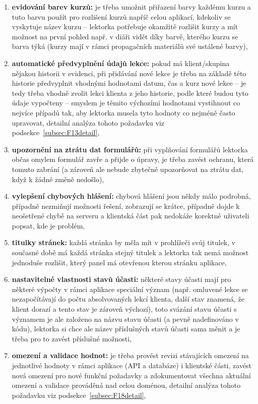 \begin{enumerate}[label=\textbf{F\arabic*}]
    \item \label{F12} \textbf{evidování barev kurzů:} je třeba umožnit přiřazení barvy každému kurzu a tuto barvu použít pro rozlišení kurzů napříč celou aplikací, kdekoliv se vyskytuje název kurzu -- lektorka potřebuje okamžitě rozlišit kurzy a mít možnost na první pohled např. v diáři vidět díky barvě, kterého kurzu se barva týká (kurzy mají v rámci propagačních materiálů své ustálené barvy),
    \item \label{F13} \textbf{automatické předvyplnění údajů lekce:} pokud má klient/skupina nějakou historii v evidenci, při přidávání nové lekce je třeba na základě této historie předvyplnit vhodnými hodnotami datum, čas a kurz nové lekce -- je tedy třeba vhodně zvolit lekci klienta z jeho historie, podle které budou tyto údaje vypočteny  -- smyslem je těmito výchozími hodnotami vystihnout co nejvíce případů tak, aby lektorka musela tyto hodnoty co nejméně často upravovat, detailní analýza tohoto požadavku viz podsekce~\ref{subsec:F13detail},
    \item \label{F14} \textbf{upozornění na ztrátu dat formulářů:} při vyplňování formulářů lektorka občas omylem formulář zavře a přijde o úpravy, je třeba zavést ochranu, která tomuto zabrání (a zároveň ale nebude zbytečně upozorňovat na ztrátu dat, když k žádné změně nedošlo),
    \item \label{F15} \textbf{vylepšení chybových hlášení:} chybová hlášení jsou někdy málo podrobná, případně nezmiňují možnosti řešení, zobrazují se krátce, případně dojde k neošetřené chybě na serveru a klientská část pak nedokáže korektně uživateli popsat, kde je problém,
    \item \label{F16} \textbf{titulky stránek:} každá stránka by měla mít v prohlížeči svůj titulek, v současné době má každá stránka stejný titulek a lektorka tak nemá možnost jednoduše rozlišit, který panel má otevřenou kterou stránku aplikace,
    \item \label{F17} \textbf{nastavitelné vlastnosti stavů účasti:} některé stavy účasti mají pro některé výpočty v rámci aplikace speciální význam (např. omluvené lekce se nezapočítávají do počtu absolvovaných lekcí klienta, další stav znamená, že klient dorazí a tento stav je zároveň výchozí), toto svázání stavu účasti s významem je ale založeno na názvu stavu účasti (a pevně nadefinováno v kódu), lektorka si chce ale název příslušných stavů účasti sama měnit a je třeba pro to zavést příslušné možnosti,
    \item \label{F18} \textbf{omezení a validace hodnot:} je třeba provést revizi stávajících omezení na jednotlivé hodnoty v rámci aplikace (API a databáze) i klientské části, zavést nová omezení pro nové funkční požadavky a zdokumentovat všechna aktuální omezení a validace prováděná nad celou doménou, detailní analýza tohoto požadavku viz podsekce~\ref{subsec:F18detail},

\end{enumerate}
